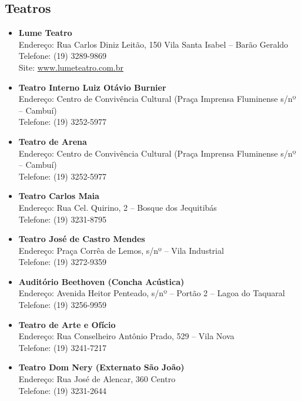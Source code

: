 \subsection{Teatros}

\begin{itemize}
\item   \textbf{Lume Teatro}
		\\Endereço:  Rua Carlos Diniz Leitão, 150 Vila Santa Isabel -- Barão Geraldo
		\\Telefone: (19) 3289-9869
		\\Site: \url{www.lumeteatro.com.br}

\item   \textbf{Teatro Interno Luiz Otávio Burnier}
		\\Endereço: Centro de Convivência Cultural (Praça Imprensa Fluminense s/nº -- Cambuí)
		\\Telefone: (19) 3252-5977

\item   \textbf{Teatro de Arena}
		\\Endereço: Centro de Convivência Cultural (Praça Imprensa Fluminense s/nº -- Cambuí)
		\\Telefone: (19) 3252-5977

\item   \textbf{Teatro Carlos Maia}
		\\Endereço: Rua Cel. Quirino, 2 -- Bosque dos Jequitibás
		\\Telefone: (19) 3231-8795

\item   \textbf{Teatro José de Castro Mendes}
		\\Endereço: Praça Corrêa de Lemos, s/nº -- Vila Industrial
		\\Telefone: (19) 3272-9359

\item   \textbf{Auditório Beethoven (Concha Acústica)}
		\\Endereço: Avenida Heitor Penteado, s/nº -- Portão 2 -- Lagoa do Taquaral
		\\Telefone: (19) 3256-9959

\item   \textbf{Teatro de Arte e Ofício}
		\\Endereço: Rua Conselheiro Antônio Prado, 529 -- Vila Nova
		\\Telefone: (19) 3241-7217

\item   \textbf{Teatro Dom Nery (Externato São João)}
		\\Endereço: Rua José de Alencar, 360  Centro
		\\Telefone: (19) 3231-2644


\end{itemize}
